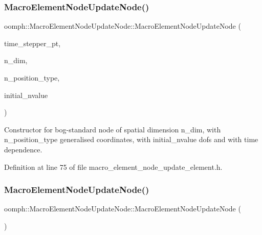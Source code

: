 \subsubsection{\texorpdfstring{Macro\+Element\+Node\+Update\+Node()}{MacroElementNodeUpdateNode()}\hspace{0.1cm}{\footnotesize\ttfamily [2/3]}}
{\footnotesize\ttfamily oomph\+::\+Macro\+Element\+Node\+Update\+Node\+::\+Macro\+Element\+Node\+Update\+Node (\begin{DoxyParamCaption}\item[{\hyperlink{classoomph_1_1TimeStepper}{Time\+Stepper} $\ast$}]{time\+\_\+stepper\+\_\+pt,  }\item[{const unsigned \&}]{n\+\_\+dim,  }\item[{const unsigned \&}]{n\+\_\+position\+\_\+type,  }\item[{const unsigned \&}]{initial\+\_\+nvalue }\end{DoxyParamCaption})\hspace{0.3cm}{\ttfamily [inline]}}



Constructor for bog-\/standard node of spatial dimension n\+\_\+dim, with n\+\_\+position\+\_\+type generalised coordinates, with initial\+\_\+nvalue dofs and with time dependence. 



Definition at line 75 of file macro\+\_\+element\+\_\+node\+\_\+update\+\_\+element.\+h.

\mbox{\label{classoomph_1_1MacroElementNodeUpdateNode_a64920d828fece6b437f6b790d60f6b85}} 
\subsubsection{\texorpdfstring{Macro\+Element\+Node\+Update\+Node()}{MacroElementNodeUpdateNode()}\hspace{0.1cm}{\footnotesize\ttfamily [3/3]}}
{\footnotesize\ttfamily oomph\+::\+Macro\+Element\+Node\+Update\+Node\+::\+Macro\+Element\+Node\+Update\+Node (\begin{DoxyParamCaption}\item[{const \hyperlink{classoomph_1_1MacroElementNodeUpdateNode}{Macro\+Element\+Node\+Update\+Node} \&}]{ }\end{DoxyParamCaption})\hspace{0.3cm}{\ttfamily [inline]}}



